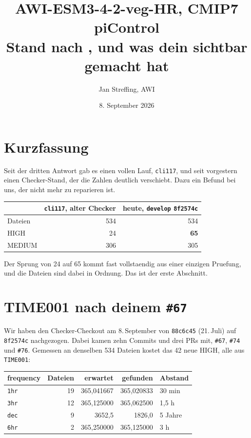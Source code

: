 \documentclass[11pt,a4paper]{article}
\title{AWI-ESM3-4-2-veg-HR, CMIP7 piControl\\[2mm]
\large Stand nach \code{cli117}, und was dein \code{\#67} sichtbar gemacht hat}
\author{Jan Streffing, AWI}
\date{8. September 2026}
\newcommand{\code}[1]{\texttt{\small #1}}
\begin{document}
\maketitle

\section{Kurzfassung}

Seit der dritten Antwort gab es einen vollen Lauf, \code{cli117}, und seit
vorgestern einen Checker-Stand, der die Zahlen deutlich verschiebt. Dazu ein
Befund bei uns, der nicht mehr zu reparieren ist.

\begin{center}
\begin{tabular}{lrr}
\toprule
& \textbf{\code{cli117}, alter Checker} & \textbf{heute, \code{develop} \code{8f2574c}} \\
\midrule
Dateien & 534 & 534 \\
HIGH    &  24 & \textbf{65} \\
MEDIUM  & 306 & 305 \\
\bottomrule
\end{tabular}
\end{center}

Der Sprung von 24 auf 65 kommt fast vollstaendig aus einer einzigen Pruefung,
und die Dateien sind dabei in Ordnung. Das ist der erste Abschnitt.

\section{TIME001 nach deinem \code{\#67}}

Wir haben den Checker-Checkout am 8.\,September von \code{88c6c45} (21.\,Juli)
auf \code{8f2574c} nachgezogen. Dabei kamen zehn Commits und drei PRs mit,
\code{\#67}, \code{\#74} und \code{\#76}. Gemessen an denselben 534 Dateien
kostet das 42 neue HIGH, alle aus \code{TIME001}:

\begin{center}
\begin{tabular}{lrrrl}
\toprule
\textbf{frequency} & \textbf{Dateien} & \textbf{erwartet} & \textbf{gefunden} & \textbf{Abstand} \\
\midrule
\code{1hr} & 19 & 365{,}041667 & 365{,}020833 & 30 min \\
\code{3hr} & 12 & 365{,}125000 & 365{,}062500 & 1{,}5 h \\
\code{dec} &  9 & 3652{,}5     & 1826{,}0     & 5 Jahre \\
\code{6hr} &  2 & 365{,}250000 & 365{,}125000 & 3 h \\
\bottomrule
\end{tabular}
\end{center}
\end{document}

